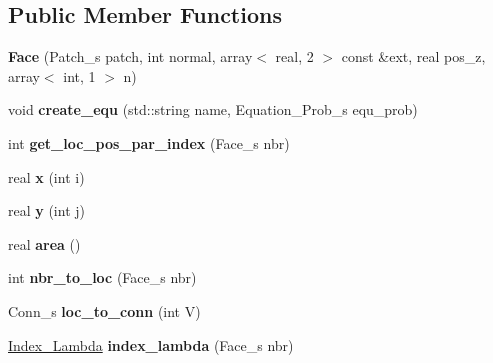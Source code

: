 \subsection*{Public Member Functions}
\begin{DoxyCompactItemize}
\item 
\hypertarget{classFace_a3b8f88dfdae278eb7ac120e3a09ae333}{{\bfseries Face} (Patch\-\_\-s patch, int normal, array$<$ real, 2 $>$ const \&ext, real pos\-\_\-z, array$<$ int, 1 $>$ n)}\label{classFace_a3b8f88dfdae278eb7ac120e3a09ae333}

\item 
\hypertarget{classFace_a23e698d2341c3634212729c78bba154f}{void {\bfseries create\-\_\-equ} (std\-::string name, Equation\-\_\-\-Prob\-\_\-s equ\-\_\-prob)}\label{classFace_a23e698d2341c3634212729c78bba154f}

\item 
\hypertarget{classFace_a7ebc4163752a05d82e184a3a4c8671b3}{int {\bfseries get\-\_\-loc\-\_\-pos\-\_\-par\-\_\-index} (Face\-\_\-s nbr)}\label{classFace_a7ebc4163752a05d82e184a3a4c8671b3}

\item 
\hypertarget{classFace_aed5980668f26bc29338dfa11b32919f5}{real {\bfseries x} (int i)}\label{classFace_aed5980668f26bc29338dfa11b32919f5}

\item 
\hypertarget{classFace_a9a4d892bf5e8782c898e15aa5a989806}{real {\bfseries y} (int j)}\label{classFace_a9a4d892bf5e8782c898e15aa5a989806}

\item 
\hypertarget{classFace_a2d20ebd0d99063967bb26657abebbcbe}{real {\bfseries area} ()}\label{classFace_a2d20ebd0d99063967bb26657abebbcbe}

\item 
\hypertarget{classFace_a06eb55371bc742e523a9eb94a573209d}{int {\bfseries nbr\-\_\-to\-\_\-loc} (Face\-\_\-s nbr)}\label{classFace_a06eb55371bc742e523a9eb94a573209d}

\item 
\hypertarget{classFace_a60baec409a104a88e6622efa2f80122c}{Conn\-\_\-s {\bfseries loc\-\_\-to\-\_\-conn} (int V)}\label{classFace_a60baec409a104a88e6622efa2f80122c}

\item 
\hypertarget{classFace_a9a5eb93863dc767848261afa813ca039}{\hyperlink{structIndex__Lambda}{Index\-\_\-\-Lambda} {\bfseries index\-\_\-lambda} (Face\-\_\-s nbr)}\label{classFace_a9a5eb93863dc767848261afa813ca039}


\end{DoxyCompactItemize}
